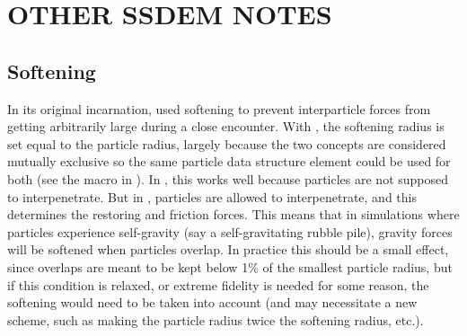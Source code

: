 \section{OTHER SSDEM NOTES}

\subsection{Softening}

In its original incarnation,  used softening to prevent
interparticle forces from getting arbitrarily large during a close
encounter.  With , the softening radius is set equal
to the particle radius, largely because the two concepts are
considered mutually exclusive so the same particle data structure
element could be used for both (see the  macro in
).  In , this works well because
particles are not supposed to interpenetrate.  But in ,
particles are allowed to interpenetrate, and this determines the
restoring and friction forces.  This means that in simulations where
particles experience self-gravity (say a self-gravitating rubble
pile), gravity forces will be softened when particles overlap.  In
practice this should be a small effect, since overlaps are meant to be
kept below 1\% of the smallest particle radius, but if this condition
is relaxed, or extreme fidelity is needed for some reason, the
softening would need to be taken into account (and may necessitate a
new scheme, such as making the particle radius twice the softening
radius, etc.).


